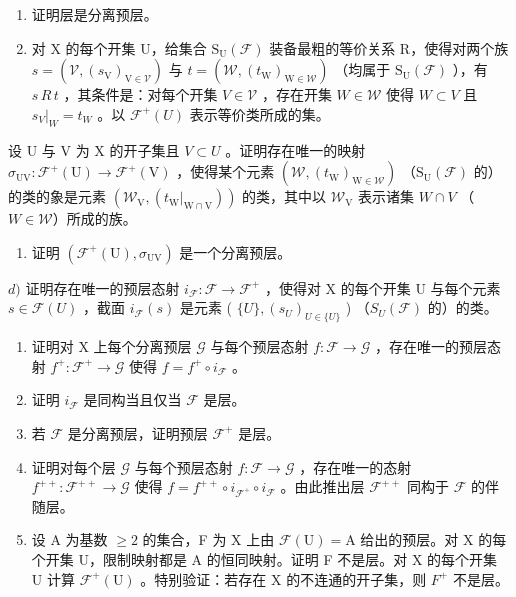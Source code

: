 \begin{enumerate}
\def\labelenumi{\alph{enumi})}
\item
  证明层是分离预层。
\item
  对 X 的每个开集 U，给集合 \(\mathrm{S}_{\mathrm{U}}(\mathcal{F})\) 装备最粗的等价关系 R，使得对两个族 \(s = (\mathcal{V}, (s_{\mathrm{V}})_{\mathrm{V} \in \mathcal{V}})\) 与 \(t = (\mathcal{W}, (t_{\mathrm{W}})_{\mathrm{W} \in \mathcal{W}})\) （均属于 \(\mathrm{S}_{\mathrm{U}}(\mathcal{F})\) ），有 \(s\,R\,t\) ，其条件是：对每个开集 \(V \in \mathcal{V}\) ，存在开集 \(W \in \mathcal{W}\) 使得 \(W \subset V\) 且 \(s_{V}|_{W} = t_{W}\) 。以 \(\mathcal{F}^{+}(U)\) 表示等价类所成的集。
\end{enumerate}

设 U 与 V 为 X 的开子集且 \(V \subset U\) 。证明存在唯一的映射 \(\sigma_{\mathrm{UV}}: \mathcal{F}^{+}(\mathrm{U}) \to \mathcal{F}^{+}(\mathrm{V})\) ，使得某个元素 \((\mathcal{W}, (t_{\mathrm{W}})_{\mathrm{W} \in \mathcal{W}})\) （\(\mathrm{S}_{\mathrm{U}}(\mathcal{F})\) 的）的类的象是元素 \((\mathcal{W}_{\mathrm{V}}, (t_{\mathrm{W}}|_{\mathrm{W} \cap \mathrm{V}}))\) 的类，其中以 \(\mathcal{W}_{\mathrm{V}}\) 表示诸集 \(W \cap V\) （\(W \in \mathcal{W}\)）所成的族。

\begin{enumerate}
\def\labelenumi{\alph{enumi})}
\setcounter{enumi}{2}
\tightlist
\item
  证明 \((\mathcal{F}^{+}(\mathrm{U}),\sigma_{\mathrm{UV}})\) 是一个分离预层。
\end{enumerate}

\(d)\) 证明存在唯一的预层态射 \(i_{\mathcal{F}}: \mathcal{F} \to \mathcal{F}^{+}\) ，使得对 X 的每个开集 U 与每个元素 \(s \in \mathcal{F}(U)\) ，截面 \(i_{\mathcal{F}}(s)\) 是元素 ( \(\{U\}, (s_U)_{U \in \{U\}}\) ) （\(S_U(\mathcal{F})\) 的）的类。

\begin{enumerate}
\def\labelenumi{\alph{enumi})}
\setcounter{enumi}{4}
\item
  证明对 X 上每个分离预层 \(\mathcal{G}\) 与每个预层态射 \(f\colon \mathcal{F} \to \mathcal{G}\) ，存在唯一的预层态射 \(f^{+}\colon \mathcal{F}^{+} \to \mathcal{G}\) 使得 \(f = f^{+} \circ i_{\mathcal{F}}\) 。
\item
  证明 \(i_{\mathcal{F}}\) 是同构当且仅当 \(\mathcal{F}\) 是层。
\item
  若 \(\mathcal{F}\) 是分离预层，证明预层 \(\mathcal{F}^{+}\) 是层。
\item
  证明对每个层 \(\mathcal{G}\) 与每个预层态射 \(f\colon \mathcal{F}\to \mathcal{G}\) ，存在唯一的态射 \(f^{++}\colon \mathcal{F}^{++}\to \mathcal{G}\) 使得 \(f = f^{++}\circ i_{\mathcal{F}^+}\circ i_{\mathcal{F}}\) 。由此推出层 \(\mathcal{F}^{++}\) 同构于 \(\mathcal{F}\) 的伴随层。
\item
  设 A 为基数 \(\geqslant2\) 的集合，F 为 X 上由 \(\mathcal{F}(\mathrm{U})=\mathrm{A}\) 给出的预层。对 X 的每个开集 U，限制映射都是 A 的恒同映射。证明 F 不是层。对 X 的每个开集 U 计算 \(\mathcal{F}^{+}(\mathrm{U})\) 。特别验证：若存在 X 的不连通的开子集，则 \(F^{+}\) 不是层。
\end{enumerate}

